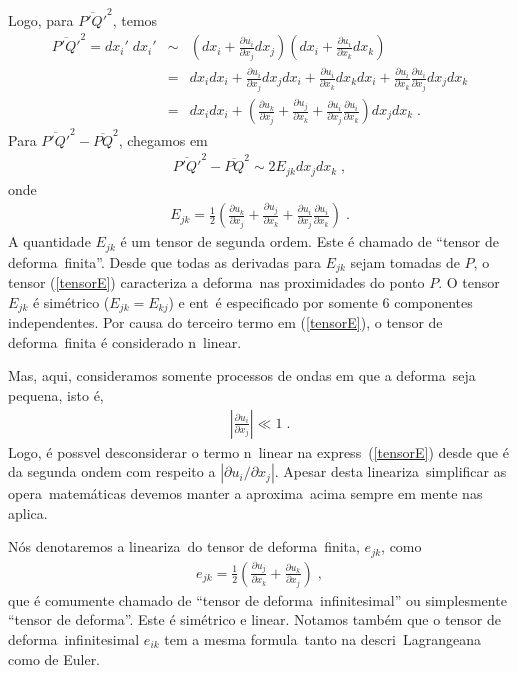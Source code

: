Logo, para $\overline{P'Q'}^2$, temos
\begin{eqnarray}
\overline{P'Q'}^2 = dx_i' \; dx_i' &\sim& \left(dx_i +
\frac{\partial u_i}{\partial x_j} dx_j\right) \left(dx_i +
\frac{\partial u_i}{\partial x_k} dx_k\right) \\
&=& dx_i dx_i +  \frac{\partial u_i}{\partial x_j} dx_j
dx_i + \frac{\partial u_i}{\partial x_k} dx_k  dx_i
+ \frac{\partial u_i}{\partial x_k} \frac{\partial u_i}
{\partial x_j} dx_j dx_k \\
&=& dx_i dx_i + \left( \frac{\partial u_k}{\partial x_j} +
\frac{\partial u_j}{\partial x_k} + \frac{\partial u_i}
{\partial x_j} \frac{\partial u_i}{\partial x_k}\right)
dx_j dx_k \; .
\end{eqnarray}
Para $\overline{P'Q'}^2 - \overline{PQ}^2$, chegamos em
\begin{eqnarray}
\overline{P'Q'}^2 - \overline{PQ}^2 \sim 2 E_{jk}
dx_j dx_k \; ,
\end{eqnarray}
onde
\begin{eqnarray} \label{tensorE}
E_{jk} = \frac{1}{2} \left( \frac{\partial u_k}
{\partial x_j} + \frac{\partial u_j}{\partial x_k} +
\frac{\partial u_i}{\partial x_j} \frac{\partial u_i}
{\partial x_k}\right) \; .
\end{eqnarray}
A quantidade $E_{jk}$ \'e um tensor de segunda ordem.
Este \'e chamado de ``tensor de deforma\cao\ finita''.
Desde que todas as derivadas para $E_{jk}$ sejam tomadas
de $P$, o tensor (\ref{tensorE}) caracteriza a
deforma\cao\ nas proximidades do ponto $P$. O tensor
$E_{jk}$ \'e sim\'etrico ($E_{jk} = E_{kj}$) e ent\ao\ \'e
especificado por somente 6 componentes independentes. Por
causa do terceiro termo em (\ref{tensorE}), o tensor de
deforma\cao\ finita \'e considerado n\ao\ linear.

Mas, aqui, consideramos somente processos de ondas
em que a deforma\cao\ seja pequena, isto \'e,
\begin{eqnarray}
\left|\frac{\partial u_i}{\partial x_j}\right| \ll 1 \; .
\label{def_peq}
\end{eqnarray}
Logo, \'e poss\ih vel desconsiderar o termo n\ao\ linear
na express\ao\ (\ref{tensorE}) desde que \'e da segunda
ondem com respeito a  $|\partial u_i / \partial x_j|$.
Apesar desta lineariza\cao\ simplificar as opera\coes\
matem\'aticas devemos manter a aproxima\cao\ acima sempre
em mente nas aplica\coes.

N\'os denotaremos a lineariza\cao\ do tensor de
deforma\cao\ finita, $e_{jk}$, como
\begin{eqnarray} \label{td}
e_{jk} = \frac{1}{2} \left( \frac{\partial u_j}
{\partial x_k} +\frac{\partial u_k}{\partial x_j}\right)
\; ,
\end{eqnarray}
que \'e comumente chamado de ``tensor de deforma\cao\
infinitesimal'' ou simplesmente ``tensor de deforma\cao''.
Este \'e sim\'etrico e linear. Notamos tamb\'em que o
tensor de deforma\cao\ infinitesimal $e_{ik}$ tem a mesma formula\cao\
tanto na descri\cao\ Lagrangeana como de Euler.

